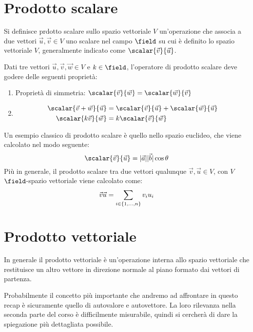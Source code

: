 \section{Prodotto scalare}
Si definisce prdotto scalare sullo spazio vettoriale $V$ un'operazione che associa a due vettori $\vec{u}, \vec{v} \in V$ uno scalare nel campo $\field$ su cui è definito lo spazio vettoriale $V$, generalmente indicato come $\scalar{\vec{v}}{\vec{u}}$.

Dati tre vettori $\vec{u}, \vec{v}, \vec{w} \in V$ e $k \in \field$, l'operatore di prodotto scalare deve godere delle seguenti proprietà:
\begin{enumerate}
	\renewcommand{\labelenumi}{(P\arabic{enumi})}
	\item Proprietà di simmetria: $\scalar{\vec{v}}{\vec{w}} = \scalar{\vec{w}}{\vec{v}}$
	\item
	      \begin{align*}
		      \scalar{\vec{v} + \vec{w}}{\vec{u}} & = \scalar{\vec{v}}{\vec{u}} + \scalar{\vec{w}}{\vec{u}} \\
		      \scalar{k\vec{v}}{\vec{w}}          & = k\scalar{\vec{v}}{\vec{w}}
	      \end{align*}
\end{enumerate}
Un esempio classico di prodotto scalare è quello nello spazio euclideo, che viene calcolato nel modo seguente:
\begin{equation}
	\scalar{\vec{v}}{\vec{u}} = |\vec{a}| |\vec{b}| \cos{\theta}
\end{equation}
Più in generale, il prodotto scalare tra due vettori qualunque $\vec{v}, \vec{u} \in V$, con $V$ $\field$-spazio vettoriale viene calcolato come:
\begin{equation}
	\scantokens{\vec{v}}{\vec{u}} = \sum_{i \in \{1, \dots, n\}} v_iu_i
\end{equation}
\section{Prodotto vettoriale}
In generale il prodotto vettoriale è un'operazione interna allo spazio vettoriale che restituisce un altro vettore in direzione normale al piano formato dai vettori di partenza.

\bigbreak
Probabilmente il concetto più importante che andremo ad affrontare in questo recap è sicuramente quello di autovalore e autovettore. La loro rilevanza nella seconda parte del corso è difficilmente misurabile, quindi si cercherà di dare la spiegazione più dettagliata possibile.
